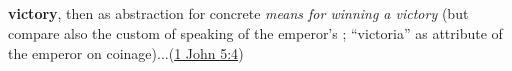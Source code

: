 			\subparagraph{\texorpdfstring{}{}}
				\label{NIKE}
			
				\begin{compactdesc}
					\item[BDAG 597a] \textbf{}
						\begin{compactitem}
							\item \textbf{victory}, then as abstraction for concrete \textit{means for winning a victory} (but compare also the custom of speaking of the emperor's ; ``victoria'' as attribute of the emperor on coinage)...(\hyperref[1JOHN-5-4]{1 John 5:4})
						\end{compactitem}
				\end{compactdesc}
				
				
				
		
	
		
